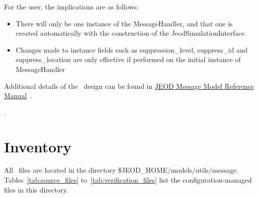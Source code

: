 For the user, the implications are as follows:
\begin{itemize}
\item There will only be one instance of
the MessageHandler, and that one is created
automatically with the construction
of the JeodSimulationInterface.
\item Changes made to instance fields such as suppression\_level, 
suppress\_id and suppress\_location are only effective if performed on
the initial instance of MessageHandler
\end{itemize}

Additional details of the \MessageHandlerDesc\ design can be found in
\hyperref{file:refman.pdf}{}{}
{JEOD Message Model Reference Manual}~\cite{message_refman}.

.	\section{Inventory}

All \MessageHandlerDesc\ files are located in the directory
\$JEOD\_HOME/models/utils/message.
Tables~\ref{tab:source_files} to~\ref{tab:verification_files}
list the configuration-managed files in this directory.



